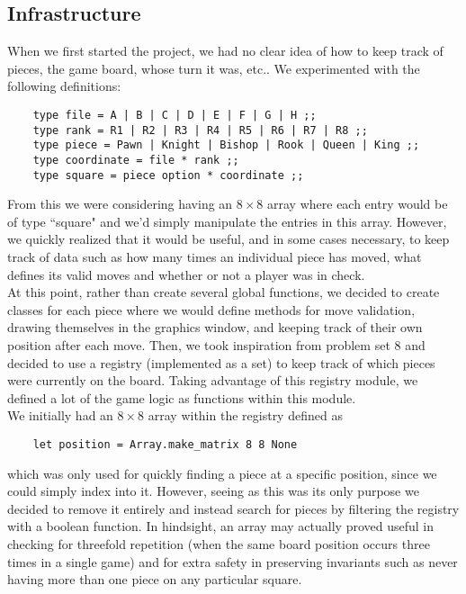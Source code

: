 \documentclass{article}
\begin{document}
\subsection{Infrastructure}
When we first started the project, we had no clear idea of how to keep track of pieces, the game board, whose turn it was, etc.. We experimented with the following definitions:
\begin{verbatim}
    type file = A | B | C | D | E | F | G | H ;;
    type rank = R1 | R2 | R3 | R4 | R5 | R6 | R7 | R8 ;;
    type piece = Pawn | Knight | Bishop | Rook | Queen | King ;;
    type coordinate = file * rank ;;
    type square = piece option * coordinate ;;
\end{verbatim}
From this we were considering having an $8 \times 8$ array where each entry would be of type ``square" and we'd simply manipulate the entries in this array. However, we quickly realized that it would be useful, and in some cases necessary, to keep track of data such as how many times an individual piece has moved, what defines its valid moves and whether or not a player was in check. \\ 
At this point, rather than create several global functions, we decided to create classes for each piece where we would define methods for move validation, drawing themselves in the graphics window, and keeping track of their own position after each move. Then, we took inspiration from problem set 8 and decided to use a registry (implemented as a set) to keep track of which pieces were currently on the board. Taking advantage of this registry module, we defined a lot of the game logic as functions within this module. \\
We initially had an $8 \times 8$ array within the registry defined as
\begin{verbatim}
    let position = Array.make_matrix 8 8 None
\end{verbatim}
which was only used for quickly finding a piece at a specific position, since we could simply index into it. However, seeing as this was its only purpose we decided to remove it entirely and instead search for pieces by filtering the registry with a boolean function. In hindsight, an array may actually proved useful in checking for threefold repetition (when the same board position occurs three times in a single game) and for extra safety in preserving invariants such as never having more than one piece on any particular square. 
\end{document}
